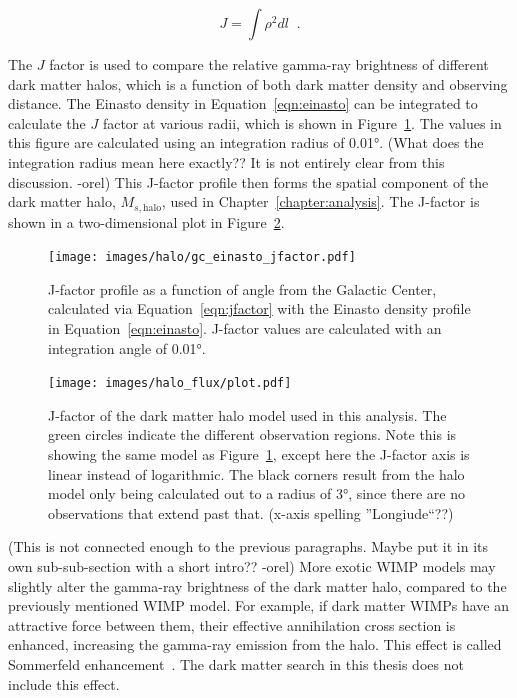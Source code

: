     \begin{equation}\label{eqn:jfactor}
      J = \int \rho^2 dl \;\; .
    \end{equation}

    The $J$ factor is used to compare the relative gamma-ray brightness of different dark matter halos, which is a function of both dark matter density and observing distance.
    The Einasto density in Equation~\ref{eqn:einasto} can be integrated to calculate the $J$ factor at various radii, which is shown in Figure~\ref{fig:gchalo_jfactor}.
    The values in this figure are calculated using an integration radius of \ang{0.01}.
    {\color{red}(What does the integration radius mean here exactly?? It is not entirely clear from this discussion. -orel)}
    This J-factor profile then forms the spatial component of the dark matter halo, $M_{s,\textrm{halo}}$, used in Chapter~\ref{chapter:analysis}.
    The J-factor is shown in a two-dimensional plot in Figure~\ref{fig:halojfactor}.
    
    \begin{figure}[ht]
    \centering
      \texttt{[image: images/halo/gc\_einasto\_jfactor.pdf]}
      \caption[Galactic Center Einasto Halo Jfactor]{
        J-factor profile as a function of angle from the Galactic Center, calculated via Equation~\ref{eqn:jfactor} with the Einasto density profile in Equation~\ref{eqn:einasto}.
        J-factor values are calculated with an integration angle of \ang{0.01}.
      }
      \label{fig:gchalo_jfactor}
    \end{figure}
    
  
  \begin{figure}[ht]
    \centering
    \texttt{[image: images/halo\_flux/plot.pdf]}
    \caption[Galactic Center Halo J-factor Skymap]{
      J-factor of the dark matter halo model used in this analysis.
      The green circles indicate the different observation regions.
      Note this is showing the same model as Figure~\ref{fig:gchalo_jfactor}, except here the J-factor axis is linear instead of logarithmic.
      The black corners result from the halo model only being calculated out to a radius of \ang{3}, since there are no observations that extend past that.
      {\color{red}(x-axis spelling ''Longiude``??)}
    }
    \label{fig:halojfactor}
  \end{figure}

  {\color{red}(This is not connected enough to the previous paragraphs. Maybe put it in its own sub-sub-section with a short intro?? -orel)}
  More exotic WIMP models may slightly alter the gamma-ray brightness of the dark matter halo, compared to the previously mentioned WIMP model.
  For example, if dark matter WIMPs have an attractive force between them, their effective annihilation cross section is enhanced, increasing the gamma-ray emission from the halo.
  This effect is called Sommerfeld enhancement~\cite{sommerfeld}.
  The dark matter search in this thesis does not include this effect.
    
